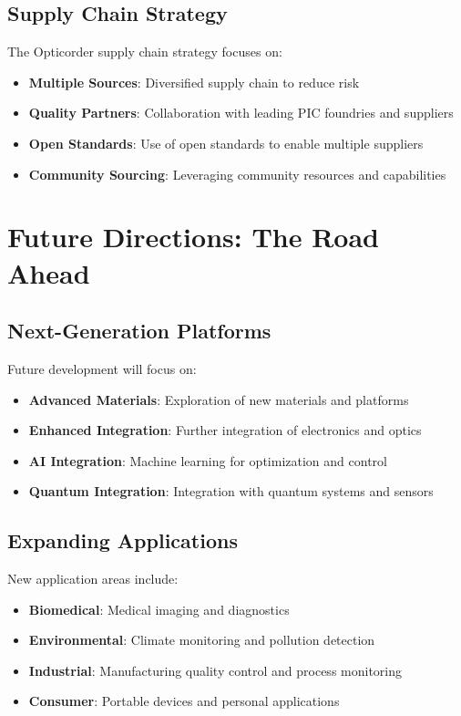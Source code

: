 \documentclass[11pt,a4paper]{article}
\begin{document}
\subsection{Supply Chain Strategy}
The Opticorder supply chain strategy focuses on:
\begin{itemize}
\item \textbf{Multiple Sources}: Diversified supply chain to reduce risk
\item \textbf{Quality Partners}: Collaboration with leading PIC foundries and suppliers
\item \textbf{Open Standards}: Use of open standards to enable multiple suppliers
\item \textbf{Community Sourcing}: Leveraging community resources and capabilities
\end{itemize}

\section{Future Directions: The Road Ahead}

\subsection{Next-Generation Platforms}
Future development will focus on:
\begin{itemize}
\item \textbf{Advanced Materials}: Exploration of new materials and platforms
\item \textbf{Enhanced Integration}: Further integration of electronics and optics
\item \textbf{AI Integration}: Machine learning for optimization and control
\item \textbf{Quantum Integration}: Integration with quantum systems and sensors
\end{itemize}

\subsection{Expanding Applications}
New application areas include:
\begin{itemize}
\item \textbf{Biomedical}: Medical imaging and diagnostics
\item \textbf{Environmental}: Climate monitoring and pollution detection
\item \textbf{Industrial}: Manufacturing quality control and process monitoring
\item \textbf{Consumer}: Portable devices and personal applications
\end{itemize}
\end{document}
